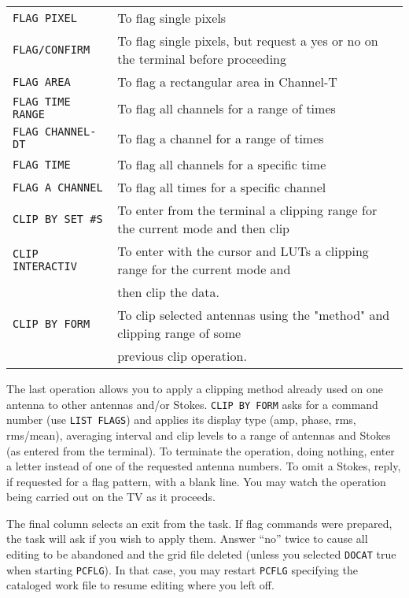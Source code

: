 \documentclass[twoside]{article}
\begin{document}
\begin{center}
\begin{tabular}{|l|l|}\hline
{\tt FLAG PIXEL      } & To flag single pixels\\
{\tt FLAG/CONFIRM    } & To flag single pixels, but request a yes or no on
                      the terminal before proceeding\\
{\tt FLAG AREA       } & To flag a rectangular area in Channel-T\\
{\tt FLAG TIME RANGE } & To flag all channels for a range of times\\
{\tt FLAG CHANNEL-DT } & To flag a channel for a range of times\\
{\tt FLAG TIME       } & To flag all channels for a specific time\\
{\tt FLAG A CHANNEL  } & To flag all times for a specific channel\\
{\tt CLIP BY SET \#S } & To enter from the terminal a clipping range for
                      the current mode and then clip\\
{\tt CLIP INTERACTIV } & To enter with the cursor and LUTs a clipping range
                      for the current mode and\\
                       & then clip the data.\\
{\tt CLIP BY FORM    } & To clip selected antennas using the "method"
                      and clipping range of some\\
                       & previous clip operation.\\ \hline
\end{tabular}
\end{center}
The last operation allows you to apply a clipping method already used on
one antenna to other antennas and/or Stokes.  {\tt CLIP BY FORM} asks
for a command number (use {\tt LIST FLAGS}) and applies its display
type (amp, phase, rms, rms/mean), averaging interval and clip levels
to a range of antennas and Stokes (as entered from the terminal).  To
terminate the operation, doing nothing, enter a letter instead of one
of the requested antenna numbers.  To omit a Stokes, reply, if
requested for a flag pattern, with a blank line.  You may watch the
operation being carried out on the TV as it proceeds.

The final column selects an exit from the task.  If flag commands were
prepared, the task will ask if you wish to apply them.  Answer ``no''
twice to cause all editing to be abandoned and the grid file deleted
(unless you selected {\tt DOCAT} true when starting {\tt PCFLG})\@.
In that case, you may restart {\tt PCFLG} specifying the cataloged
work file to resume editing where you left off.
\end{document}
